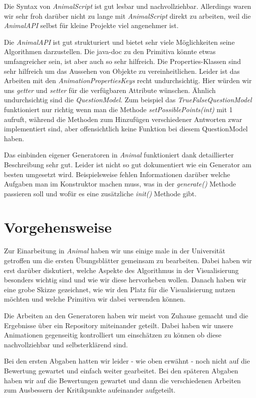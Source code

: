\documentclass[paper=a4, fontsize=12pt,titlepage=false]{scrartcl}
\begin{document}
Die Syntax von \emph{AnimalScript} ist gut lesbar und nachvollziehbar. Allerdings waren wir sehr froh darüber nicht zu lange mit \emph{AnimalScript} direkt zu arbeiten, weil die \emph{AnimalAPI} selbst für kleine Projekte viel angenehmer ist.

Die \emph{AnimalAPI} ist gut strukturiert und bietet sehr viele Möglichkeiten seine Algorithmen darzustellen. Die java-doc zu den Primitiva könnte etwas umfangreicher sein, ist aber auch so sehr hilfreich. Die Properties-Klassen sind sehr hilfreich um das Aussehen von Objekte zu vereinheitlichen. Leider ist das Arbeiten mit den \emph{AnimationPropertiesKeys} recht undurchsichtig. Hier würden wir uns \emph{getter} und \emph{setter} für die verfügbaren Attribute wünschen. Ähnlich undurchsichtig sind die \emph{QuestionModel}. Zum beispiel das \emph{TrueFalseQuestionModel} funktioniert nur richtig wenn man die Methode \emph{setPossiblePoints(int)} mit 1 aufruft, während die Methoden zum Hinzufügen verschiedener Antworten zwar implementiert sind, aber offensichtlich keine Funktion bei diesem QuestionModel haben.

Das einbinden eigener Generatoren in \emph{Animal} funktioniert dank detaillierter Beschreibung sehr gut. Leider ist nicht so gut dokumentiert wie ein Generator am besten umgesetzt wird. Beispielsweise fehlen Informationen darüber welche Aufgaben man im Konstruktor machen muss, was in der \emph{generate()} Methode passieren soll und wofür es eine zusätzliche \emph{init()} Methode gibt.

\section{Vorgehensweise}

Zur Einarbeitung in \emph{Animal} haben wir uns einige male in der Universität getroffen um die ersten Übungsblätter gemeinsam zu bearbeiten. Dabei haben wir erst darüber diskutiert, welche Aspekte des Algorithmus in der Visualisierung besonders wichtig sind und wie wir diese hervorheben wollen. Danach haben wir eine grobe Skizze gezeichnet, wie wir den Platz für die Visualisierung nutzen möchten und welche Primitiva wir dabei verwenden können.

Die Arbeiten an den Generatoren haben wir meist von Zuhause gemacht und die Ergebnisse über ein Repository miteinander geteilt. Dabei haben wir unsere Animationen gegenseitig kontrolliert um einschätzen zu können ob diese nachvollziehbar und selbsterklärend sind.

Bei den ersten Abgaben hatten wir leider - wie oben erwähnt - noch nicht auf die Bewertung gewartet und einfach weiter gearbeitet. Bei den späteren Abgaben haben wir auf die Bewertungen gewartet und dann die verschiedenen Arbeiten zum Ausbessern der Kritikpunkte aufeinander aufgeteilt.
\end{document}
